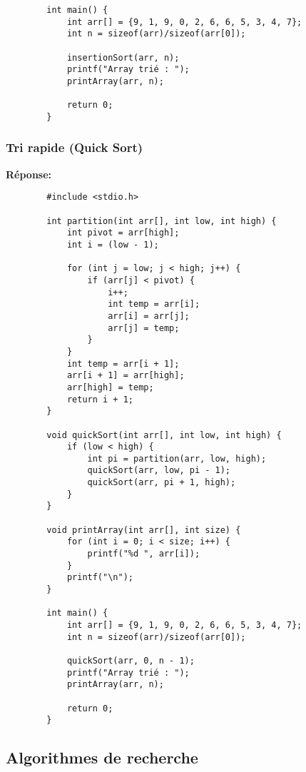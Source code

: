 \begin{enumerate}
\begin{lstlisting}
		int main() {
			int arr[] = {9, 1, 9, 0, 2, 6, 6, 5, 3, 4, 7};
			int n = sizeof(arr)/sizeof(arr[0]);
			
			insertionSort(arr, n);
			printf("Array trié : ");
			printArray(arr, n);
			
			return 0;
		}
	\end{lstlisting}
	
	\subsubsection{Tri rapide (Quick Sort)}
	
	\textbf{Réponse:}
	\begin{lstlisting}
		#include <stdio.h>
		
		int partition(int arr[], int low, int high) {
			int pivot = arr[high];
			int i = (low - 1);
			
			for (int j = low; j < high; j++) {
				if (arr[j] < pivot) {
					i++;
					int temp = arr[i];
					arr[i] = arr[j];
					arr[j] = temp;
				}
			}
			int temp = arr[i + 1];
			arr[i + 1] = arr[high];
			arr[high] = temp;
			return i + 1;
		}
		
		void quickSort(int arr[], int low, int high) {
			if (low < high) {
				int pi = partition(arr, low, high);
				quickSort(arr, low, pi - 1);
				quickSort(arr, pi + 1, high);
			}
		}
		
		void printArray(int arr[], int size) {
			for (int i = 0; i < size; i++) {
				printf("%d ", arr[i]);
			}
			printf("\n");
		}
		
		int main() {
			int arr[] = {9, 1, 9, 0, 2, 6, 6, 5, 3, 4, 7};
			int n = sizeof(arr)/sizeof(arr[0]);
			
			quickSort(arr, 0, n - 1);
			printf("Array trié : ");
			printArray(arr, n);
			
			return 0;
		}
	\end{lstlisting}
\end{enumerate}

\subsection{Algorithmes de recherche}

